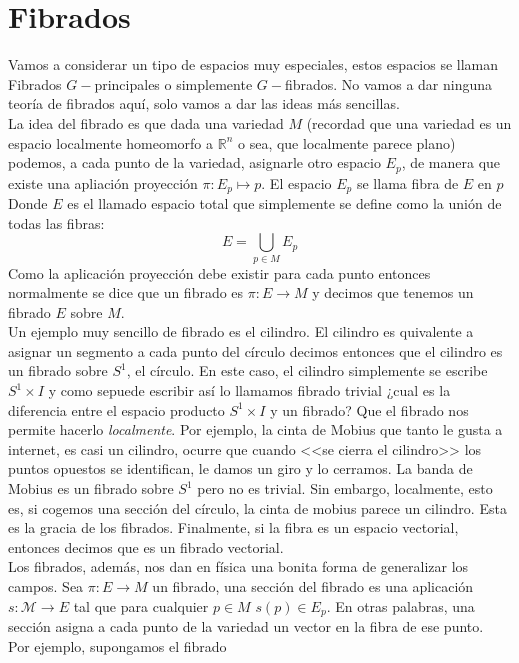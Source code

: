 \documentclass[12pt]{article}
\begin{document}
\section*{Fibrados}
Vamos a considerar un tipo de espacios muy especiales, estos espacios se llaman Fibrados $G-$principales o simplemente $G-$fibrados. No vamos a dar ninguna teoría de fibrados aquí, solo vamos a dar las ideas más sencillas.\\
La idea del fibrado es que dada una variedad $M$ (recordad que una variedad es un espacio localmente homeomorfo a $\mathbb{R}^n$ o sea, que localmente parece plano) podemos, a cada punto de la variedad, asignarle otro espacio $E_p$, de  manera que existe una apliación proyección $\pi :E_p\mapsto p$. El espacio $E_p$ se llama fibra de $E$ en $p$ Donde $E$ es el llamado espacio total que simplemente se define como la unión de todas las fibras:
\begin{equation}
    E=\bigcup_{p\in M}E_p
\end{equation}
Como la aplicación proyección debe existir para cada punto entonces normalmente se dice que un fibrado es $\pi :E\rightarrow M$ y decimos que tenemos un fibrado $E$ sobre $M$. \\
Un ejemplo muy sencillo de fibrado es el cilindro. El cilindro es quivalente a asignar un segmento a cada punto del círculo decimos entonces que el cilindro es un fibrado sobre $S^1$, el círculo. En este caso, el cilindro simplemente se escribe $S^1\times I $  y como sepuede escribir así lo llamamos fibrado trivial ¿cual es la diferencia entre el espacio producto $S^1\times I$ y un fibrado? Que el fibrado nos permite hacerlo \textit{localmente}. Por ejemplo, la cinta de Mobius que tanto le gusta a internet, es casi un cilindro, ocurre que cuando <<se cierra el cilindro>> los puntos opuestos se identifican, le damos un giro y lo cerramos. La banda de Mobius es un fibrado sobre $S^1$ pero no es trivial. Sin embargo, localmente, esto es, si cogemos una sección del círculo, la cinta de mobius parece un cilindro. Esta es la gracia de los fibrados. Finalmente, si la fibra es un espacio vectorial, entonces decimos que es un fibrado vectorial. \\
Los fibrados, además, nos dan en física una bonita forma de generalizar los campos. Sea $\pi: E\rightarrow M$ un fibrado, una sección del fibrado es una aplicación $s:\mathcal{M}\rightarrow E$ tal que para cualquier $p\in M$ $s(p)\in E_p$. En otras palabras, una sección asigna a cada punto de la variedad un vector en la fibra de ese punto. \\ Por ejemplo, supongamos el fibrado 
\end{document}
